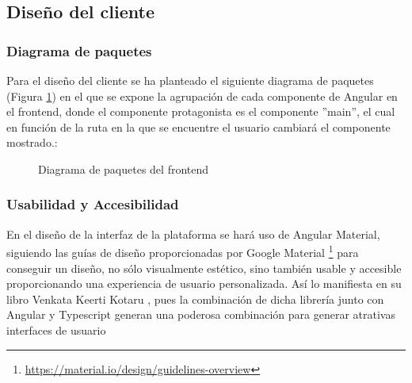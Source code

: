 \subsection{Diseño del cliente}

\subsubsection*{Diagrama de paquetes}
Para el diseño del cliente se ha planteado el siguiente diagrama de paquetes (Figura \ref{fig:paquetes-frontend}) en el que se expone la agrupación de cada componente de Angular en el frontend, donde el componente protagonista es el componente ''main'', el cual en función de la ruta en la que se encuentre el usuario cambiará el componente mostrado.:

\begin{figure}[H]
    \caption{Diagrama de paquetes del frontend}
    \label{fig:paquetes-frontend}
\end{figure}

\subsubsection*{Usabilidad y Accesibilidad}
En el diseño de la interfaz de la plataforma se hará uso de Angular Material, siguiendo las guías de diseño proporcionadas por Google Material \footnote{\url{https://material.io/design/guidelines-overview}} para conseguir un diseño, no sólo visualmente estético, sino también usable y accesible proporcionando una experiencia de usuario personalizada. Así lo manifiesta en su libro Venkata Keerti Kotaru \cite{kotaru2020material}, pues la combinación de dicha librería junto con Angular y Typescript generan una poderosa combinación para generar atrativas interfaces de usuario\bigskip

